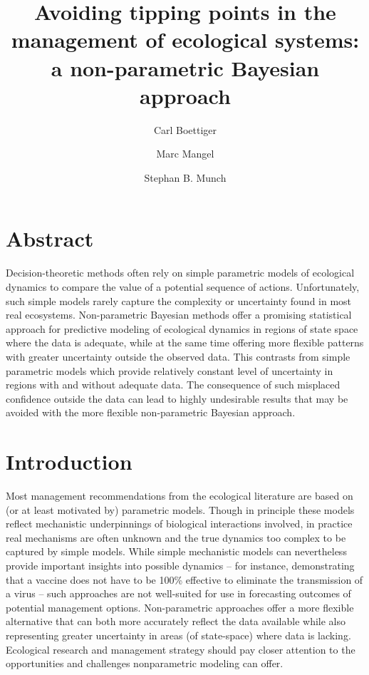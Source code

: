 \documentclass[author-year, review]{elsarticle} %
\begin{document}
\begin{frontmatter}
  \title{Avoiding tipping points in the management of ecological systems: a
         non-parametric Bayesian approach}
  \author[cstar]{Carl Boettiger}
  \author[cstar]{Marc Mangel}
  \author[noaa]{Stephan B. Munch}
  \address[cstar]{Center for Stock Assessment Research, Department of Applied Math and Statistics, University of California, Mail Stop SOE-2, Santa Cruz, CA 95064, USA}
  \address[noaa]{Southwest Fisheries Science Center, National Oceanic and Atmospheric Administration, 110 Shaffer Road, Santa Cruz, CA 95060, USA}
 \end{frontmatter}


\section{Abstract}

Decision-theoretic methods often rely on simple parametric models of
ecological dynamics to compare the value of a potential sequence of
actions. Unfortunately, such simple models rarely capture the complexity
or uncertainty found in most real ecosystems. Non-parametric Bayesian
methods offer a promising statistical approach for predictive modeling
of ecological dynamics in regions of state space where the data is
adequate, while at the same time offering more flexible patterns with
greater uncertainty outside the observed data. This contrasts from
simple parametric models which provide relatively constant level of
uncertainty in regions with and without adequate data. The consequence
of such misplaced confidence outside the data can lead to highly
undesirable results that may be avoided with the more flexible
non-parametric Bayesian approach.

\section{Introduction}

Most management recommendations from the ecological literature are based
on (or at least motivated by) parametric models. Though in principle
these models reflect mechanistic underpinnings of biological
interactions involved, in practice real mechanisms are often unknown and
the true dynamics too complex to be captured by simple models. While
simple mechanistic models can nevertheless provide important insights
into possible dynamics -- for instance, demonstrating that a vaccine
does not have to be 100\% effective to eliminate the transmission of a
virus -- such approaches are not well-suited for use in forecasting
outcomes of potential management options. Non-parametric approaches
offer a more flexible alternative that can both more accurately reflect
the data available while also representing greater uncertainty in areas
(of state-space) where data is lacking. Ecological research and
management strategy should pay closer attention to the opportunities and
challenges nonparametric modeling can offer.
\end{document}
